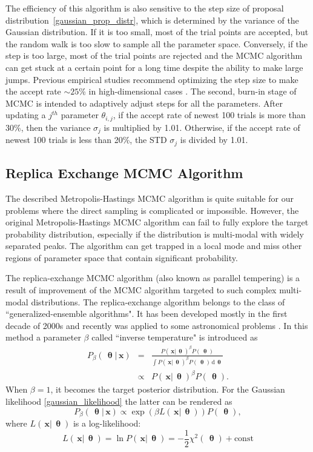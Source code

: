 \documentclass[preprint2]{aastex}
\newcommand{\bfx}{\,\mathbf{x}}
\newcommand{\bfth}{\,\bm{\uptheta}}
\newcommand{\ud}{\,\mathrm{d}}
\begin{document}
The efficiency of this algorithm is also sensitive to the step size of proposal distribution~\eqref{gaussian_prop_distr}, which is determined by the variance of the Gaussian distribution. If it is too small, most of the trial points are accepted, but the random walk is too slow to sample all the parameter space. Conversely, if the step is too large, most of the trial points are rejected and the MCMC algorithm can get stuck at a certain point for a long time despite the ability to make large jumps. Previous empirical studies recommend optimizing the step size to make the accept rate $\sim 25$\% in high-dimensional cases \citep[see references in][]{Gregory2005}. The second, burn-in stage of MCMC is intended to adaptively adjust steps for all the parameters. After updating a $j^{th}$ parameter $\theta_{i,j}$, if the accept rate of newest 100 trials is more than 30\%, then the variance $\sigma_j$ is multiplied by 1.01. Otherwise, if the accept rate of newest 100 trials is less than 20\%, the STD $\sigma_j$ is divided by 1.01. 



\subsection{Replica Exchange MCMC Algorithm}

The described Metropolis-Hastings MCMC algorithm is quite suitable for our problems where the direct sampling is complicated or impossible. However, the original Metropolis-Hastings MCMC algorithm can fail to fully explore the target probability distribution, especially if the distribution is multi-modal with widely separated peaks. The algorithm can get trapped in a local mode and miss other regions of parameter space that contain significant probability. 

The replica-exchange MCMC algorithm (also known as parallel tempering) is a result of improvement of the MCMC algorithm targeted to such complex multi-modal distributions. The replica-exchange algorithm belongs to the class of ``generalized-ensemble algorithms". It has been developed mostly in the first decade of 2000s and recently was applied to some astronomical problems \citep{Gregory2005,Varghese_etal2011,Benneke_Seager2012}. In this method a parameter $\beta$ called ``inverse temperature" is introduced as
\begin{eqnarray}
  \label{post_distr_beta}
  P_\beta(\bfth|\bfx) &=&  \frac{P(\bfx|\bfth)^\beta P(\bfth)}{\int P(\bfx|\bfth)^\beta P(\bfth) \ud \bfth} \nonumber \\
                     &\propto & P(\bfx|\bfth)^\beta P(\bfth)  .
\end{eqnarray}
When $\beta=1$, it becomes the target posterior distribution. For the Gaussian likelihood \eqref{gaussian_likelihood} the latter can be rendered as
\begin{equation}
      P_\beta(\bfth|\bfx) \propto \exp \left( \beta L(\bfx|\bfth) \right) P(\bfth),
\end{equation}
where $L(\bfx|\bfth)$ is a log-likelihood:
\begin{equation}
  L(\bfx|\bfth) = \ln P(\bfx|\bfth) = -\frac{1}{2}\chi^2(\bfth) + \mathrm{const}
\end{equation}
\end{document}
